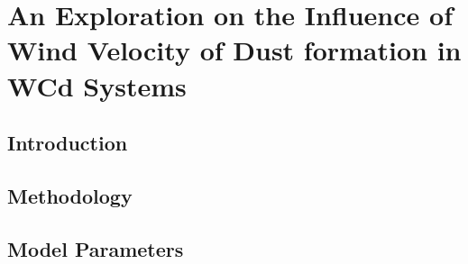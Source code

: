 \chapter[Influence of Wind Velocity on Dust Formation]{An Exploration on the Influence of Wind Velocity of Dust formation in WCd Systems}

\section{Introduction}

\section{Methodology}

\section{Model Parameters}

